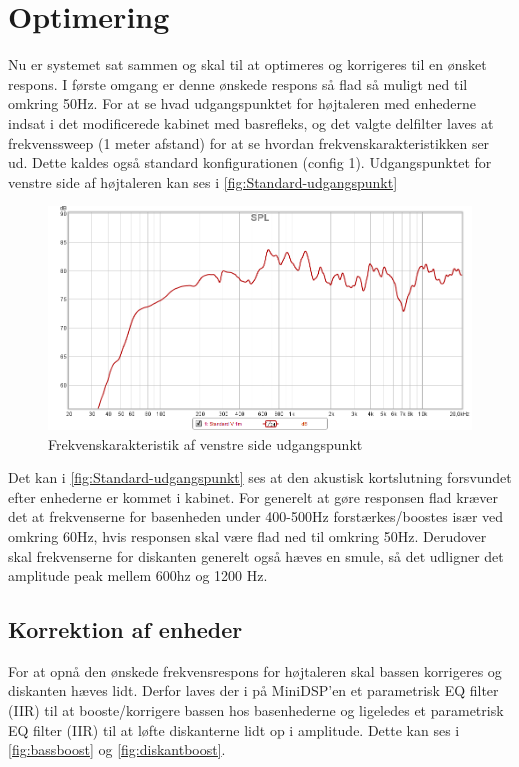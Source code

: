 \section{Optimering}
Nu er systemet sat sammen og skal til at optimeres og korrigeres til en ønsket respons. I første omgang er denne ønskede respons så flad så muligt ned til omkring 50Hz. For at se hvad udgangspunktet for højtaleren med enhederne indsat i det modificerede kabinet med basrefleks, og det valgte delfilter laves at frekvenssweep (1 meter afstand) for at se hvordan frekvenskarakteristikken ser ud. Dette kaldes også standard konfigurationen (config 1).  
Udgangspunktet for venstre side af højtaleren kan ses i \autoref*{fig:Standard-udgangspunkt}

\begin{figure}[H] 
	\center
	\includegraphics[width=1\linewidth]{figur/Standard-udgangspunkt}\quad
	\caption{Frekvenskarakteristik af venstre side udgangspunkt}
	\label{fig:Standard-udgangspunkt}
\end{figure}

Det kan i \autoref{fig:Standard-udgangspunkt} ses at den akustisk kortslutning forsvundet efter enhederne er kommet i kabinet. For generelt at gøre responsen flad kræver det at frekvenserne for basenheden under 400-500Hz forstærkes/boostes især ved omkring 60Hz, hvis responsen skal være flad ned til omkring 50Hz. Derudover skal frekvenserne for diskanten generelt også hæves en smule, så det udligner det amplitude peak mellem 600hz og 1200 Hz. 


\subsection{Korrektion af enheder}
For at opnå den ønskede frekvensrespons for højtaleren skal bassen korrigeres og diskanten hæves lidt. Derfor laves der i på MiniDSP'en et parametrisk EQ filter (IIR) til at booste/korrigere bassen hos basenhederne og ligeledes et parametrisk EQ filter (IIR) til at løfte diskanterne lidt op i amplitude. Dette kan ses i \autoref{fig:bassboost} og \autoref{fig:diskantboost}. 

